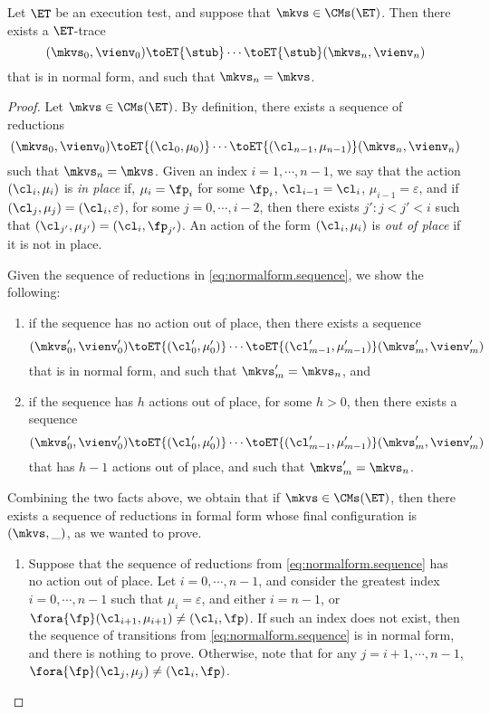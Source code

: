 \begin{proposition}
\label{prop:et.normalform}
Let $\ET$ be an execution test, and suppose that $\mkvs \in \CMs(\ET)$. Then there exists a $\ET$-trace  
\[
(\mkvs_0, \vienv_0) \toET{\stub} \cdots \toET{\stub} (\mkvs_n, \vienv_{n})
\]
that is in normal form, and such that $\mkvs_{n} = \mkvs$.
\end{proposition}
\begin{proof}
Let $\mkvs \in \CMs(\ET)$. By definition, there exists a sequence of reductions 
\begin{equation}
\label{eq:normalform.sequence}
(\mkvs_{0}, \vienv_{0}) \toET{(\cl_0, \mu_0)} \cdots \toET{(\cl_{n-1}, \mu_{n-1})} (\mkvs_n, \vienv_{n})
\end{equation}
such that $\mkvs_{n} = \mkvs$. Given an index $i = 1,\cdots, n-1$, we say that the action $(\cl_{i}, \mu_{i})$ is \emph{in place} 
if, $\mu_{i} = \fp_{i}$ for some $\fp_{i}$, $\cl_{i-1} = \cl_{i}$, $\mu_{i-1} = \varepsilon$, and if $(\cl_{j}, \mu_{j}) = (\cl_{i}, \varepsilon)$, 
for some  $j = 0,\cdots, i-2$, then there exists $j': j < j' < i$ such that $(\cl_{j'}, \mu_{j'}) = (\cl_i, \fp_{j'})$. An action of the 
form $(\cl_{i}, \mu_{i})$ is \emph{out of place} if it is not in place. 

Given the sequence of reductions in \cref{eq:normalform.sequence}, we show the following: 
\begin{enumerate}
\item if the sequence has no action out of place, then there exists a sequence 
\[
(\mkvs'_{0}, \vienv'_{0}) \toET{(\cl'_{0}, \mu'_{0})} \cdots \toET{(\cl'_{m-1}, \mu'_{m-1})} (\mkvs'_{m}, \vienv'_{m})
\]
that is in normal form, and such that $\mkvs'_{m} = \mkvs_{n}$, and 
\item if the sequence has $h$ actions out of place, for some $h > 0$, then there exists a sequence 
\[
(\mkvs'_{0}, \vienv'_{0}) \toET{(\cl'_{0}, \mu'_{0})} \cdots \toET{(\cl'_{m-1}, \mu'_{m-1})} (\mkvs'_{m}, \vienv'_{m})
\]
that has $h-1$ actions out of place, and such that $\mkvs'_{m} = \mkvs_{n}$.
\end{enumerate}
Combining the two facts above, we obtain that if $\mkvs \in \CMs(\ET)$, then there exists a sequence of reductions in formal form whose final 
configuration is $(\mkvs, \_)$, as we wanted to prove.

\begin{enumerate}
\item 
Suppose that the sequence of reductions from \cref{eq:normalform.sequence} has no action out of place. 
Let $i=0,\cdots, n-1$, and consider the greatest index $i=0,\cdots, n-1$ such that  
$\mu_{i} = \varepsilon$, and either $i = n-1$, or 
$\fora{ \fp } (\cl_{i+1}, \mu_{i+1}) \neq (\cl_{i}, \fp)$. 
If such an index does not exist, then the sequence of transitions from \cref{eq:normalform.sequence} is in 
normal form, and there is nothing to prove. Otherwise, note that for any $j = i+1,\cdots, n-1$, 
$\fora{ \fp } (\cl_{j}, \mu_{j}) \neq (\cl_{i}, \fp)$. 


\end{enumerate}
\end{proof}
